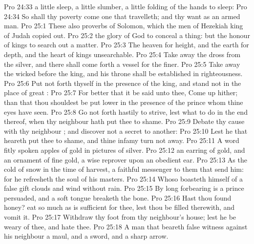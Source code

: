 \vs Pro 24:33  a little sleep, a little slumber, a little folding of the hands to sleep:
\vs Pro 24:34 So shall thy poverty come  one that travelleth; and thy want as an armed man.
\vs Pro 25:1 These  also proverbs of Solomon, which the men of Hezekiah king of Judah copied out.
\vs Pro 25:2  the glory of God to conceal a thing: but the honour of kings  to search out a matter.
\vs Pro 25:3 The heaven for height, and the earth for depth, and the heart of kings  unsearchable.
\vs Pro 25:4 Take away the dross from the silver, and there shall come forth a vessel for the finer.
\vs Pro 25:5 Take away the wicked  before the king, and his throne shall be established in righteousness.
\vs Pro 25:6 Put not forth thyself in the presence of the king, and stand not in the place of great :
\vs Pro 25:7 For better  that it be said unto thee, Come up hither; than that thou shouldest be put lower in the presence of the prince whom thine eyes have seen.
\vs Pro 25:8 Go not forth hastily to strive, lest  what to do in the end thereof, when thy neighbour hath put thee to shame.
\vs Pro 25:9 Debate thy cause with thy neighbour ; and discover not a secret to another:
\vs Pro 25:10 Lest he that heareth  put thee to shame, and thine infamy turn not away.
\vs Pro 25:11 A word fitly spoken  apples of gold in pictures of silver.
\vs Pro 25:12  an earring of gold, and an ornament of fine gold,  a wise reprover upon an obedient ear.
\vs Pro 25:13 As the cold of snow in the time of harvest,  a faithful messenger to them that send him: for he refresheth the soul of his masters.
\vs Pro 25:14 Whoso boasteth himself of a false gift  clouds and wind without rain.
\vs Pro 25:15 By long forbearing is a prince persuaded, and a soft tongue breaketh the bone.
\vs Pro 25:16 Hast thou found honey? eat so much as is sufficient for thee, lest thou be filled therewith, and vomit it.
\vs Pro 25:17 Withdraw thy foot from thy neighbour's house; lest he be weary of thee, and  hate thee.
\vs Pro 25:18 A man that beareth false witness against his neighbour  a maul, and a sword, and a sharp arrow.
